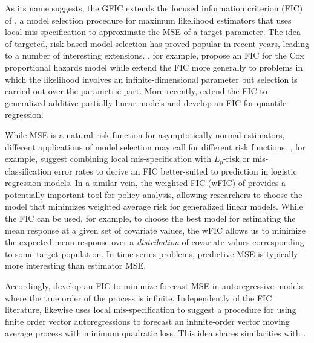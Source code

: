 As its name suggests, the GFIC extends the focused information criterion (FIC) of \cite{ClaeskensHjort2003}, a model selection procedure for maximum likelihood estimators that uses local mis-specification to approximate the MSE of a target parameter. 
The idea of targeted, risk-based model selection has proved popular in recent years, leading to a number of interesting extensions. 
\cite{HjortClaeskens2006}, for example, propose an FIC for the Cox proportional hazards model while \cite{ClaeskensCarroll} extend the FIC more generally to problems in which the likelihood involves an infinite-dimensional parameter but selection is carried out over the parametric part. 
More recently, \cite{ZhangLiang} extend the FIC to generalized additive partially linear models and \cite{BehlClaeskensDette} develop an FIC for quantile regression.

While MSE is a natural risk-function for asymptotically normal estimators, different applications of model selection may call for different risk functions. \cite{ClaeskensCroux2006}, for example, suggest combining local mis-specification with $L_p$-risk or mis-classification error rates to derive an FIC better-suited to prediction in logistic regression models. 
In a similar vein, the weighted FIC (wFIC) of \cite{ClaeskensHjort2008} provides a potentially important tool for policy analysis, allowing researchers to choose the model that minimizes weighted average risk for generalized linear models. 
While the FIC can be used, for example, to choose the best model for estimating the mean response at a given set of covariate values, the wFIC allows us to minimize the expected mean response over a \emph{distribution} of covariate values corresponding to some target population.
In time series problems, predictive MSE is typically more interesting than estimator MSE.

Accordingly, \cite{ClaeskensCroux} develop an FIC to minimize forecast MSE in autoregressive models where the true order of the process is infinite. 
Independently of the FIC literature, \cite{Schorfheide2005} likewise uses local mis-specification to suggest a procedure for using finite order vector autoregressions to forecast an infinite-order vector moving average process with minimum quadratic loss. 
This idea shares similarities with \cite{Skouras2001}.
 
